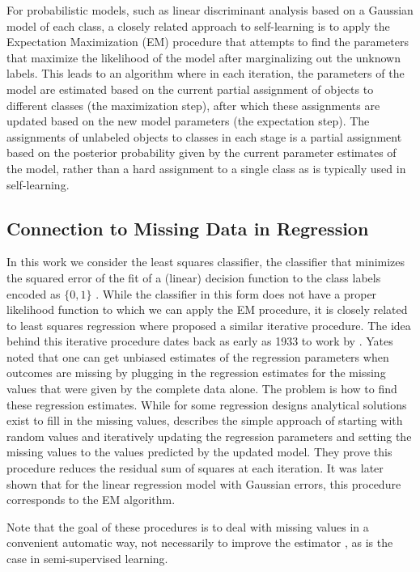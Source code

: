 \documentclass[twoside]{memoir}\usepackage[]{graphicx}\usepackage{xcolor}
\renewcommand{\cite}{\citep}
\begin{document}
For probabilistic models, such as linear discriminant analysis based on a Gaussian model of each class, a closely related approach to self-learning is to apply the Expectation Maximization (EM) procedure \citep{Dempster1977} that attempts to find the parameters that maximize the likelihood  of the model after marginalizing out the unknown labels. This leads to an algorithm where in each iteration, the parameters of the model are estimated based on the current partial assignment of objects to different classes (the maximization step), after which these assignments are updated based on the new model parameters (the expectation step). The assignments of unlabeled objects to classes in each stage is a partial assignment based on the posterior probability given by the current parameter estimates of the model, rather than a hard assignment to a single class as is typically used in self-learning.

\subsection{Connection to Missing Data in Regression}
In this work we consider the least squares classifier, the classifier that minimizes the squared error of the fit of a (linear) decision function to the class labels encoded as $\{0,1\}$ \cite[p.103]{Hastie2009}. While the classifier in this form does not have a proper likelihood function to which we can apply the EM procedure, it is closely related to least squares regression where \citet{Healy1956} proposed a similar iterative procedure. The idea behind this iterative procedure dates back as early as 1933 to work by \citet{Yates1933}. Yates noted that one can get unbiased estimates of the regression parameters when outcomes are missing by plugging in the regression estimates for the missing values that were given by the complete data alone. The problem is how to find these regression estimates. While for some regression designs analytical solutions exist \cite{Wilkinson1958} to fill in the missing values, \citet{Healy1956} describes the simple approach of starting with random values and iteratively updating the regression parameters and setting the missing values to the values predicted by the updated model.
They prove this procedure reduces the residual sum of squares at each iteration. It was later shown \cite{Dempster1977} that for the linear regression model with Gaussian errors, this procedure corresponds to the EM algorithm.

Note that the goal of these procedures is to deal with missing values in a convenient automatic way, not necessarily to improve the estimator \cite[Ch. 2]{Little2002}, as is the case in semi-supervised learning.
\end{document}

